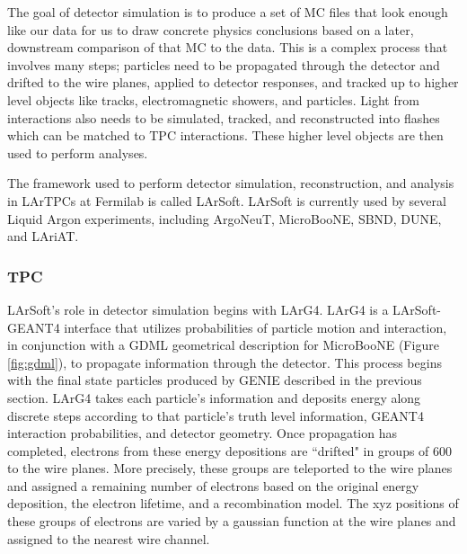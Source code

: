 \par The goal of detector simulation is to produce a set of MC files that look enough like our data for us to draw concrete physics conclusions based on a later, downstream comparison of that MC to the data. This is a complex process that involves many steps; particles need to be propagated through the detector and drifted to the wire planes, applied to detector responses, and tracked up to higher level objects like tracks, electromagnetic showers, and particles. Light from interactions also needs to be simulated, tracked, and reconstructed into flashes which can be matched to TPC interactions. These higher level objects are then used to perform analyses. 
\par The framework used to perform detector simulation, reconstruction, and analysis in LArTPCs at Fermilab is called LArSoft. LArSoft is currently used by several Liquid Argon experiments, including ArgoNeuT, MicroBooNE, SBND, DUNE, and LAriAT. 
\subsubsection{TPC}
\par LArSoft's role in detector simulation begins with LArG4. LArG4 is a LArSoft-GEANT4 interface that utilizes probabilities of particle motion and interaction, in conjunction with a GDML geometrical description for MicroBooNE (Figure \ref{fig:gdml}), to propagate information through the detector.  This process begins with the final state particles produced by GENIE described in the previous section. LArG4 takes each particle's information and deposits energy along discrete steps according to that particle's truth level information, GEANT4 interaction probabilities, and detector geometry. Once propagation has completed, electrons from these energy depositions are ``drifted" in groups of 600 to the wire planes. More precisely, these groups are teleported to the wire planes and assigned a remaining number of electrons based on the original energy deposition, the electron lifetime, and a recombination model. The xyz positions of these groups of electrons are varied by a gaussian function at the wire planes and assigned to the nearest wire channel. 

